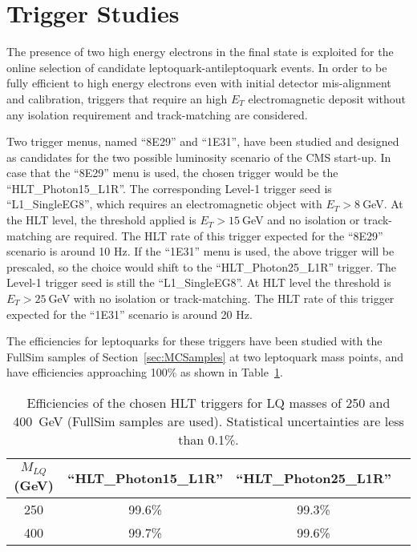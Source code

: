 %
\section{Trigger Studies} \label{sec:trig}

The presence of two high energy electrons in the final state is exploited for the online selection 
of candidate leptoquark-antileptoquark events.
In order to be fully efficient to high energy electrons even with initial detector mis-alignment 
and calibration, triggers that require an high $E_T$ electromagnetic deposit without any isolation 
requirement and track-matching are considered.

Two trigger menus, named ``8E29'' and ``1E31'', have been studied and designed as candidates for 
the two possible luminosity scenario of the CMS start-up.
In case that the ``8E29'' menu is used, the chosen trigger would be the ``HLT\_Photon15\_L1R''.
The corresponding Level-1 trigger seed is ``L1\_SingleEG8'', which requires an electromagnetic object with 
$E_T>8~$GeV. At the HLT level, the threshold applied is $E_T>15~$GeV and no isolation or track-matching
are required. The HLT rate of this trigger expected for the ``8E29'' scenario is around 10 Hz.
If the ``1E31'' menu is used, the above trigger will be prescaled, so the choice would shift to the
``HLT\_Photon25\_L1R'' trigger. The Level-1 trigger seed is still the ``L1\_SingleEG8''. At HLT level the 
threshold is $E_T>25~$GeV with no isolation or track-matching. 
The HLT rate of this trigger expected for the ``1E31'' scenario is around 20 Hz.

The efficiencies for leptoquarks for these triggers have been studied with the FullSim 
samples of Section~\ref{sec:MCSamples} at two leptoquark mass points, and have efficiencies approaching
100\% as shown in Table~\ref{tab:HLTEffic}.

\begin{table}[htbp]
\begin{center}
\begin{tabular}{|c|c|c|c|}
\hline\hline
$M_{LQ}$ (GeV)     & ``HLT\_Photon15\_L1R''  &  ``HLT\_Photon25\_L1R'' \\
\hline\hline
250                & 99.6\%   & 99.3\%  \\
400                & 99.7\%   & 99.6\%  \\
\hline\hline
\end{tabular}
\end{center}
\caption{Efficiencies of the chosen HLT triggers for LQ masses of 250 and 400~GeV (FullSim samples are used). 
Statistical uncertainties are less than 0.1\%.}
\label{tab:HLTEffic}
\end{table}






%

